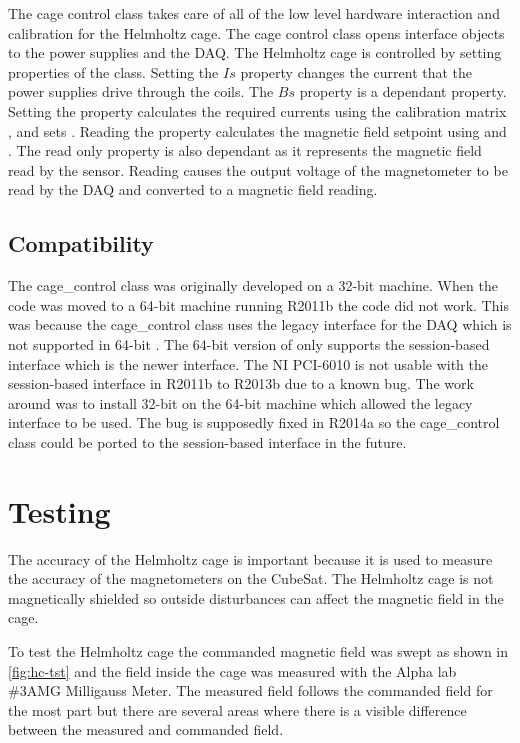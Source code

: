 The cage control class takes care of all of the low level hardware interaction and calibration for the Helmholtz cage. The cage control class opens interface objects to the power supplies and the \ac{DAQ}. The Helmholtz cage is controlled by setting properties of the class. Setting the \lstMat$Is$ property changes the current that the power supplies drive through the coils. The \lstMat$Bs$ property is a dependant property. Setting the  property calculates the required currents using the calibration matrix , and sets . Reading the  property calculates the magnetic field setpoint using  and . The read only  property is also dependant as it represents the magnetic field read by the sensor. Reading  causes the output voltage of the magnetometer to be read by the \ac{DAQ} and converted to a magnetic field reading.

\subsection{Compatibility}

The cage\_control class was originally developed on a 32-bit machine. When the code was moved to a 64-bit machine running \matlab R2011b the code did not work. This was because the cage\_control class uses the legacy interface for the \ac{DAQ} which is not supported in 64-bit \matlab. The 64-bit version of \matlab only supports the session-based interface which is the newer interface. The NI PCI-6010 is not usable with the session-based interface in \matlab R2011b to R2013b due to a known bug. The work around was to install 32-bit \matlab on the 64-bit machine which allowed the legacy interface to be used. The bug is supposedly fixed in \matlab R2014a so the cage\_control class could be ported to the session-based interface in the future.

\section{Testing}

The accuracy of the Helmholtz cage is important because it is used to measure the accuracy of the magnetometers on the CubeSat. The Helmholtz cage is not magnetically shielded so outside disturbances can affect the magnetic field in the cage.

To test the Helmholtz cage the commanded magnetic field was swept as shown in \cref{fig:hc-tst} and the field inside the cage was measured with the Alpha lab \#3AMG Milligauss Meter. The measured field follows the commanded field for the most part but there are several areas where there is a visible difference between the measured and commanded field. 

